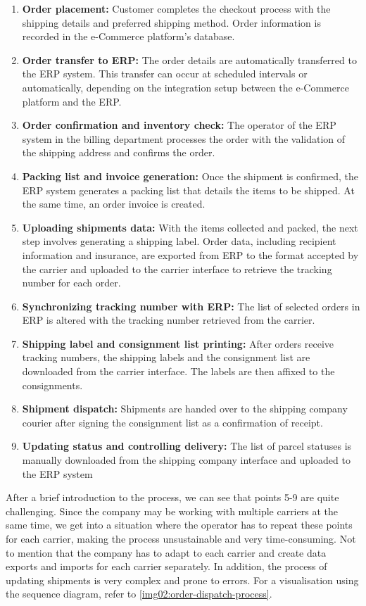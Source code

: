 \begin{enumerate}
    \item \textbf{Order placement:} Customer completes the checkout process with the shipping details and preferred shipping method. Order information is recorded in the e-Commerce platform's database.
    \item \textbf{Order transfer to \ac{ERP}:} The order details are automatically transferred to the \ac{ERP} system. This transfer can occur at scheduled intervals or automatically, depending on the integration setup between the e-Commerce platform and the \ac{ERP}.
    \item \textbf{Order confirmation and inventory check:} The operator of the ERP system in the billing department processes the order with the validation of the shipping address and confirms the order.
    \item \textbf{Packing list and invoice generation:} Once the shipment is confirmed, the \ac{ERP} system generates a packing list that details the items to be shipped. At the same time, an order invoice is created.
    \item \textbf{Uploading shipments data:} With the items collected and packed, the next step involves generating a shipping label. Order data, including recipient information and insurance, are exported from \ac{ERP} to the format accepted by the carrier and uploaded to the carrier interface to retrieve the tracking number for each order.
    \item \textbf{Synchronizing tracking number with \ac{ERP}:} The list of selected orders in \ac{ERP} is altered with the tracking number retrieved from the carrier.
    \item \textbf{Shipping label and consignment list printing:} After orders receive tracking numbers, the shipping labels and the consignment list are downloaded from the carrier interface. The labels are then affixed to the consignments.
    \item \textbf{Shipment dispatch:} Shipments are handed over to the shipping company courier after signing the consignment list as a confirmation of receipt. 
    \item \textbf{Updating status and controlling delivery:} The list of parcel statuses is manually downloaded from the shipping company interface and uploaded to the \ac{ERP} system
\end{enumerate}


After a brief introduction to the process, we can see that points 5-9 are quite challenging.
Since the company may be working with multiple carriers at the same time, we get into a situation where the operator has to repeat these points for each carrier, making the process unsustainable and very time-consuming.
Not to mention that the company has to adapt to each carrier and create data exports and imports for each carrier separately.
In addition, the process of updating shipments is very complex and prone to errors.
For a visualisation using the sequence diagram, refer to \ref{img02:order-dispatch-process}.


